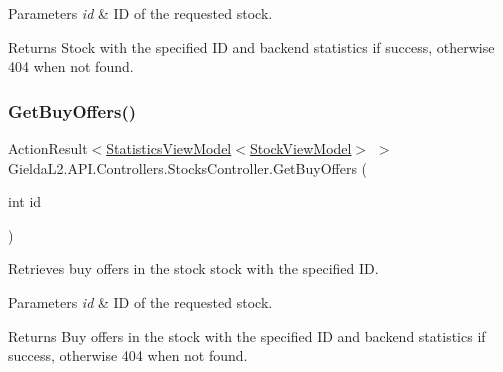 \begin{DoxyParams}{Parameters}
{\em id} & ID of the requested stock.\\
\hline
\end{DoxyParams}
\begin{DoxyReturn}{Returns}
Stock with the specified ID and backend statistics if success, otherwise 404 when not found.
\end{DoxyReturn}
\mbox{\label{class_gielda_l2_1_1_a_p_i_1_1_controllers_1_1_stocks_controller_a5ff967325fc88fb37906dbfb7ca90a27}} 
\subsubsection{\texorpdfstring{GetBuyOffers()}{GetBuyOffers()}}
{\footnotesize\ttfamily Action\+Result$<$\mbox{\hyperlink{class_gielda_l2_1_1_a_p_i_1_1_view_models_1_1_view_1_1_statistics_view_model}{Statistics\+View\+Model}}$<$\mbox{\hyperlink{class_gielda_l2_1_1_a_p_i_1_1_view_models_1_1_view_1_1_stock_view_model}{Stock\+View\+Model}}$>$ $>$ Gielda\+L2.\+A\+P\+I.\+Controllers.\+Stocks\+Controller.\+Get\+Buy\+Offers (\begin{DoxyParamCaption}\item[{int}]{id }\end{DoxyParamCaption})}



Retrieves buy offers in the stock stock with the specified ID. 


\begin{DoxyParams}{Parameters}
{\em id} & ID of the requested stock.\\
\hline
\end{DoxyParams}
\begin{DoxyReturn}{Returns}
Buy offers in the stock with the specified ID and backend statistics if success, otherwise 404 when not found.
\end{DoxyReturn}
\mbox{\label{class_gielda_l2_1_1_a_p_i_1_1_controllers_1_1_stocks_controller_afd88e89d20e7a3cbb333b685e0e38a56}} 

